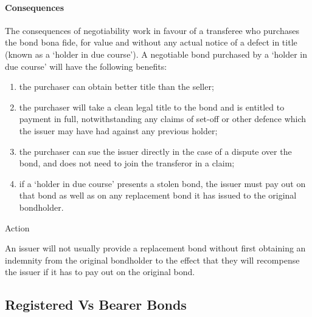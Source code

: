 \documentclass[
]{article}
\providecommand{\tightlist}{%
  \setlength{\itemsep}{0pt}\setlength{\parskip}{0pt}}
\newenvironment{env-02bd7092-3a62-48e4-8d01-dc71013a2f49}
{
    \savenotes\tcolorbox[blanker,breakable,left=5pt,borderline west={2pt}{-4pt}{aquamarine}]
}
{
    \endtcolorbox\spewnotes
}
\begin{document}
\hypertarget{consequences}{%
\paragraph{Consequences}\label{consequences}}

The consequences of negotiability work in favour of a transferee who
purchases the bond bona fide, for value and without any actual notice of
a defect in title (known as a `holder in due course'). A negotiable bond
purchased by a `holder in due course' will have the following benefits:

\begin{enumerate}
\tightlist
\item
  the purchaser can obtain better title than the seller;
\item
  the purchaser will take a clean legal title to the bond and is
  entitled to payment in full, notwithstanding any claims of set-off or
  other defence which the issuer may have had against any previous
  holder;
\item
  the purchaser can sue the issuer directly in the case of a dispute
  over the bond, and does not need to join the transferor in a claim;
\item
  if a `holder in due course' presents a stolen bond, the issuer must
  pay out on that bond as well as on any replacement bond it has issued
  to the original bondholder.
\end{enumerate}

\begin{env-02bd7092-3a62-48e4-8d01-dc71013a2f49}

Action

An issuer will not usually provide a replacement bond without first
obtaining an indemnity from the original bondholder to the effect that
they will recompense the issuer if it has to pay out on the original
bond.

\end{env-02bd7092-3a62-48e4-8d01-dc71013a2f49}

\hypertarget{registered-vs-bearer-bonds}{%
\subsection{Registered Vs Bearer
Bonds}\label{registered-vs-bearer-bonds}}
\end{document}
